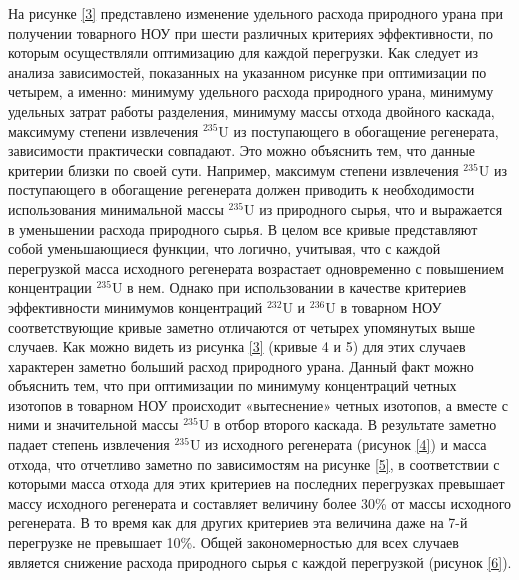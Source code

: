 На рисунке \ref{3} представлено изменение удельного расхода природного урана при получении товарного НОУ при шести различных критериях эффективности, по которым осуществляли оптимизацию для каждой перегрузки. Как следует из анализа зависимостей, показанных на указанном рисунке при оптимизации по четырем, а именно: минимуму удельного расхода природного урана, минимуму удельных затрат работы разделения, минимуму массы отхода двойного каскада, максимуму степени извлечения $^{235}$U из поступающего в обогащение регенерата, зависимости практически совпадают. Это можно объяснить тем, что данные критерии близки по своей сути. Например, максимум степени извлечения $^{235}$U из поступающего в обогащение регенерата должен приводить к необходимости использования минимальной массы $^{235}$U из природного сырья, что и выражается в уменьшении расхода природного сырья. В целом все кривые представляют собой уменьшающиеся функции, что логично, учитывая, что с каждой перегрузкой масса исходного регенерата возрастает одновременно с повышением концентрации $^{235}$U в нем. Однако при использовании в качестве критериев эффективности минимумов концентраций $^{232}$U и $^{236}$U в товарном НОУ соответствующие кривые заметно отличаются от четырех упомянутых выше случаев. Как можно видеть из рисунка \ref{3} (кривые 4 и 5) для этих случаев характерен заметно больший расход природного урана. Данный факт можно объяснить тем, что при оптимизации по минимуму концентраций четных изотопов в товарном НОУ происходит «вытеснение» четных изотопов, а вместе с ними и значительной массы $^{235}$U в отбор второго каскада. В результате заметно падает степень извлечения $^{235}$U из исходного регенерата (рисунок \ref{4}) и масса отхода, что отчетливо заметно по зависимостям на рисунке \ref{5}, в соответствии с которыми масса отхода для этих критериев на последних перегрузках превышает массу исходного регенерата и составляет величину более 30\% от массы исходного регенерата. В то время как для других критериев эта величина даже на 7-й перегрузке не превышает 10\%. Общей закономерностью для всех случаев является снижение расхода природного сырья с каждой перегрузкой (рисунок \ref{6}).


